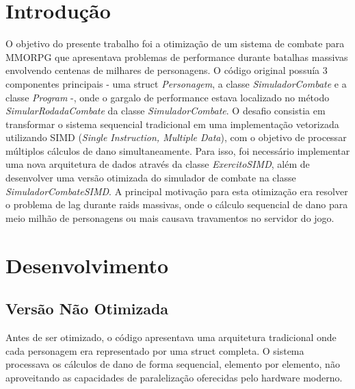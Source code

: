 \documentclass[
	12pt,				%
	oneside,			%
	a4paper,			%
	english,			%
	brazil,				%
	]{abntex2}
\begin{document}
\frenchspacing 

\imprimircapa

{
\ABNTEXchapterfont

\textual

\section{Introdução}
O objetivo do presente trabalho foi a otimização de um sistema de combate para MMORPG que apresentava problemas de performance durante batalhas massivas envolvendo centenas de milhares de personagens. O código original possuía 3 componentes principais - uma struct \textit{Personagem}, a classe \textit{SimuladorCombate} e a classe \textit{Program} -, onde o gargalo de performance estava localizado no método \textit{SimularRodadaCombate} da classe \textit{SimuladorCombate}.
O desafio consistia em transformar o sistema sequencial tradicional em uma implementação vetorizada utilizando SIMD (\textit{Single Instruction, Multiple Data}), com o objetivo de processar múltiplos cálculos de dano simultaneamente. Para isso, foi necessário implementar uma nova arquitetura de dados através da classe \textit{ExercitoSIMD}, além de desenvolver uma versão otimizada do simulador de combate na classe \textit{SimuladorCombateSIMD}.
A principal motivação para esta otimização era resolver o problema de lag durante raids massivas, onde o cálculo sequencial de dano para meio milhão de personagens ou mais causava travamentos no servidor do jogo.
\section{Desenvolvimento}
\subsection{Versão Não Otimizada}
Antes de ser otimizado, o código apresentava uma arquitetura tradicional onde cada personagem era representado por uma struct completa. O sistema processava os cálculos de dano de forma sequencial, elemento por elemento, não aproveitando as capacidades de paralelização oferecidas pelo hardware moderno.
}
\end{document}
